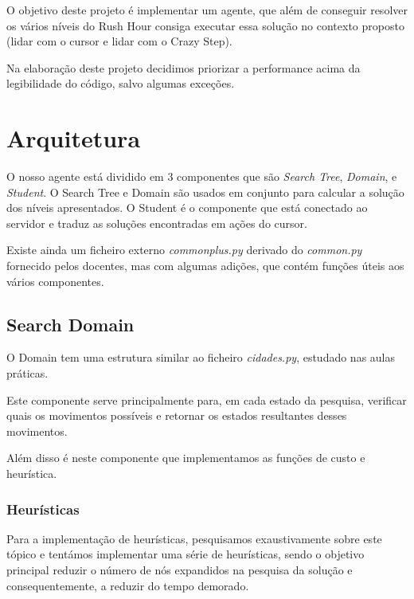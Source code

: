 \documentclass[12pt]{report}
\begin{document}
\par O objetivo deste projeto é implementar um agente, que além de conseguir resolver os vários níveis do Rush Hour consiga executar essa solução no contexto proposto (lidar com o cursor e lidar com o Crazy Step).

\par Na elaboração deste projeto decidimos priorizar a performance acima da legibilidade do código, salvo algumas exceções. 

\chapter{Arquitetura}
\par O nosso agente está dividido em 3 componentes que são \emph{Search Tree}, \emph{Domain},  e \emph{Student}. O Search Tree e Domain são usados em conjunto para calcular a solução dos níveis apresentados. O Student é o componente que está conectado ao servidor e traduz as soluções encontradas em ações do cursor. 
\par Existe ainda um ficheiro externo \emph{commonplus.py} derivado do \emph{common.py} fornecido pelos docentes, mas com algumas adições, que contém funções úteis aos vários componentes.

\section{Search Domain}
\par O Domain tem uma estrutura similar ao ficheiro \emph{cidades.py}, estudado nas aulas práticas.
\par Este componente serve principalmente para, em cada estado da pesquisa, verificar quais os movimentos possíveis e retornar os estados resultantes desses movimentos.
\par Além disso é neste componente que implementamos as funções de custo e heurística.

\subsection{Heurísticas}

\par Para a implementação de heurísticas, pesquisamos exaustivamente sobre este tópico e tentámos implementar uma série de heurísticas, sendo o objetivo principal reduzir o número de nós expandidos na pesquisa da solução e consequentemente, a reduzir do tempo demorado.
\end{document}

